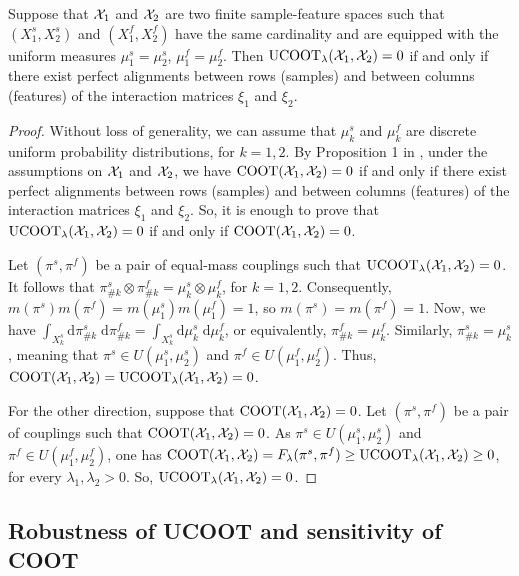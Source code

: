 \begin{claim}
  Suppose that $\mathcal X_1$ and $\mathcal X_2$ are two finite sample-feature spaces such that
  $(X^s_1, X^s_2)$ and $(X^f_1, X^f_2)$
  have the same cardinality and are equipped with the uniform measures
  $\mu_1^s = \mu_2^s$, $\mu_1^f = \mu_2^f$. Then $\text{UCOOT}_{\lambda}(\mathcal X_1, \mathcal X_2) = 0$
  if and only if there exist perfect alignments between rows (samples) and between
  columns (features) of the interaction matrices $\xi_1$ and $\xi_2$.
\end{claim}
\begin{proof}
  Without loss of generality, we can assume that $\mu_k^s$ and $\mu_k^f$ are
  discrete uniform probability distributions, for $k=1,2$. By Proposition 1 in \citep{Redko20},
  under the assumptions on $\mathcal X_1$ and $\mathcal X_2$, we have
  $\text{COOT}(\mathcal X_1, \mathcal X_2) = 0$ if and only if there exist perfect alignments
  between rows (samples) and between columns (features) of the interaction matrices $\xi_1$ and
  $\xi_2$. So, it is enough to prove that $\text{UCOOT}_{\lambda}(\mathcal X_1, \mathcal X_2) = 0$
  if and only if $\text{COOT}(\mathcal X_1, \mathcal X_2) = 0$.

  Let $(\pi^s, \pi^f)$ be a pair of equal-mass couplings such that
  $\text{UCOOT}_{\lambda}(\mathcal X_1, \mathcal X_2) = 0$. It follows that
  $\pi^s_{\#k} \otimes \pi^f_{\#k} = \mu_k^s \otimes \mu_k^f$, for $k=1,2$. Consequently,
  $m(\pi^s) m(\pi^f) = m(\mu_1^s) m(\mu_1^f) = 1$, so $m(\pi^s) = m(\pi^f) = 1$. Now, we have
  $\int_{X_k^s} \mathrm d \pi^s_{\#k} \; \mathrm d \pi^f_{\#k}
  = \int_{X_k^s} \mathrm d\mu_k^s \; \mathrm d\mu_k^f$, or equivalently,
  $\pi^f_{\#k} = \mu_k^f$. Similarly, $\pi^s_{\#k} = \mu_k^s$, meaning that
  $\pi^s \in U(\mu_1^s, \mu_2^s)$ and $\pi^f \in U(\mu_1^f, \mu_2^f)$. Thus,
  $\text{COOT}(\mathcal X_1, \mathcal X_2) = \text{UCOOT}_{\lambda}(\mathcal X_1, \mathcal X_2) = 0$.

  For the other direction, suppose that $\text{COOT}(\mathcal X_1, \mathcal X_2) = 0$.
  Let $(\pi^s, \pi^f)$ be a pair of couplings such that $\text{COOT}(\mathcal X_1, \mathcal X_2) = 0$.
  As $\pi^s \in U(\mu_1^s, \mu_2^s)$ and $\pi^f \in U(\mu_1^f, \mu_2^f)$, one has
  $\text{COOT}(\mathcal X_1, \mathcal X_2) = F_{\lambda}(\pi^s, \pi^f) \geq
  \text{UCOOT}_{\lambda}(\mathcal X_1, \mathcal X_2) \geq 0$,
  for every $\lambda_1, \lambda_2 > 0$. So, $\text{UCOOT}_{\lambda}(\mathcal X_1, \mathcal X_2) = 0$.
\end{proof}

\subsection{Robustness of UCOOT and sensitivity of COOT}

